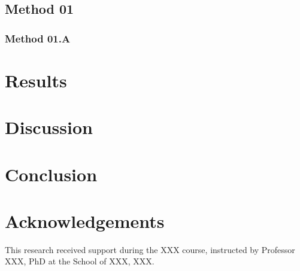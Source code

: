 \documentclass[twocolumn]{NobArticle}
\begin{document}
\subsection{Method 01}
\blindtext

\subsubsection{Method 01.A}
\blindtext

\section{Results}
\blindtext

\section{Discussion}
\blindtext

\section{Conclusion}
\blindtext

\section*{Acknowledgements}
This research received support during the XXX course, instructed by Professor XXX, PhD at the School of XXX, XXX.

\printbibliography
\end{document}
